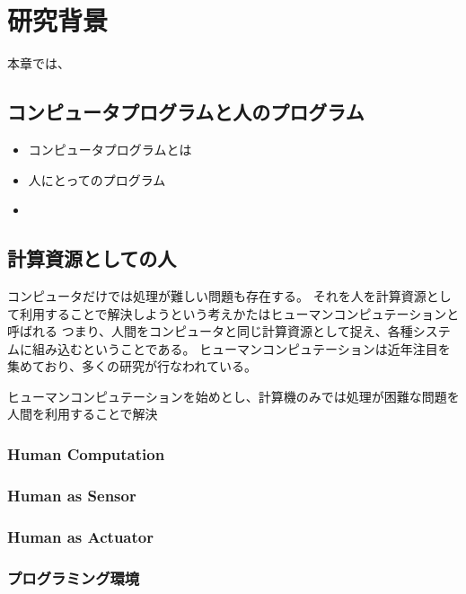 \chapter{研究背景}
\label{chap:background}

本章では、

\section{コンピュータプログラムと人のプログラム}\label{ux30b3ux30f3ux30d4ux30e5ux30fcux30bfux30d7ux30edux30b0ux30e9ux30e0ux3068ux4ebaux306eux30d7ux30edux30b0ux30e9ux30e0}

\begin{itemize}
\item
  コンピュータプログラムとは
\item
  人にとってのプログラム
\item
\end{itemize}

\section{計算資源としての人}\label{ux8a08ux7b97ux8cc7ux6e90ux3068ux3057ux3066ux306eux4eba}

コンピュータだけでは処理が難しい問題も存在する。
それを人を計算資源として利用することで解決しようという考えかたはヒューマンコンピュテーション\cite{humancomputation}と呼ばれる
つまり、人間をコンピュータと同じ計算資源として捉え、各種システムに組み込むということである。
ヒューマンコンピュテーションは近年注目を集めており、多くの研究が行なわれている。

ヒューマンコンピュテーションを始めとし、計算機のみでは処理が困難な問題を人間を利用することで解決

\subsection{Human Computation}\label{human-computation}

\subsection{Human as Sensor}\label{human-as-sensor}

\subsection{Human as Actuator}\label{human-as-actuator}

\subsection{プログラミング環境}\label{ux30d7ux30edux30b0ux30e9ux30dfux30f3ux30b0ux74b0ux5883}

